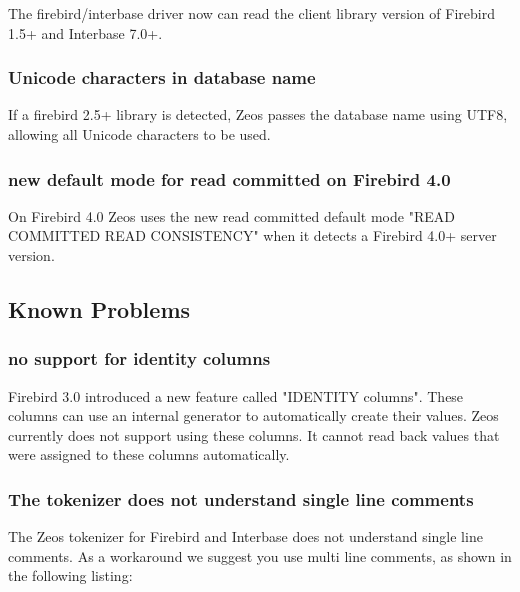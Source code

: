 \documentclass[a4paper,12pt,oneside]{book}
\begin{document}
The firebird/interbase driver now can read the client library version of Firebird 1.5+ and Interbase 7.0+.

\subsubsection{Unicode characters in database name}
\label{sec:Rev6_FirebirdInterbase_Changes_UnicodeDatabaseName}

If a firebird 2.5+ library is detected, Zeos passes the database name using UTF8, allowing all Unicode characters to be used.

\subsubsection{new default mode for read committed on Firebird 4.0}
\label{sec:Rev6_FirebirdInterbase_Changes_FB4ReadCommitted}

On Firebird 4.0 Zeos uses the new read committed default mode "READ COMMITTED READ CONSISTENCY" when it detects a Firebird 4.0+ server version.

\subsection{Known Problems}
\label{sec:Rev6_FirebirdInterbase_KnownProblems}

\subsubsection{no support for identity columns}
\label{sec:Rev6_FirebirdInterbase_KnownProblems_IdentityColumns}

Firebird 3.0 introduced a new feature called "IDENTITY columns".
These columns can use an internal generator to automatically create their values.
Zeos currently does not support using these columns.
It cannot read back values that were assigned to these columns automatically.

\subsubsection{The tokenizer does not understand single line comments}
\label{sec:Rev6_FirebirdInterbase_KnownProblems_TokenizerSingleLineComments}

The Zeos tokenizer for Firebird and Interbase does not understand single line comments.
As a workaround we suggest you use multi line comments, as shown in the following listing:
\end{document}
